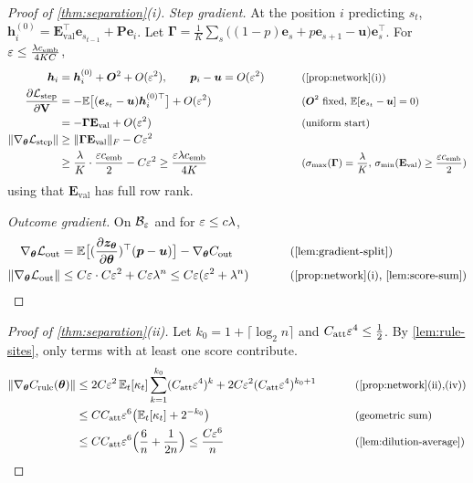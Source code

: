 \begin{proof}[Proof of \cref{thm:separation}(i)]
\emph{Step gradient.} At the position $i$ predicting $s_t$, $\bm h^{(0)}_i=\mathbf E_{\mathrm{val}}^\top\bm e_{s_{t-1}}+\mathbf P\bm e_i$. Let
$\bm\Gamma=\frac{1}{K}\sum_{s}\bigl((1-p)\bm e_s+p\bm e_{s+1}-\bm u\bigr)\bm e_s^\top$. For $\varepsilon\le\frac{\lambda c_{\mathrm{emb}}}{4KC}$,
\begin{alignat*}{2}
 \bm h_i&=\bm h^{(0)}_i+\bm O^2+O(\initscale^2),\qquad \bm p_i-\bm u=O(\initscale^2) &\qquad& \why{\cref{prop:network}(i)}\\
 \pd{\Lstep}{\mathbf V}&=-\E\bigl[(\bm e_{s_t}-\bm u)\bm h^{(0)\top}_i\bigr]+O(\initscale^2) && \why{$\bm O^2$ fixed, $\E[\bm e_{s_t}-\bm u]=0$}\\
 &=-\bm\Gamma\mathbf E_{\mathrm{val}}+O(\initscale^2) && \why{uniform start}\\
 \|\nabla_{\bm\theta}\Lstep\|&\ge\|\bm\Gamma\mathbf E_{\mathrm{val}}\|_F-C\initscale^2 && \\
 &\ge\frac{\mixrate}{K}\cdot\frac{\initscale\embconst}{2}-C\initscale^2\ge\frac{\initscale\mixrate\embconst}{4K} && \why{$\sigma_{\max}(\bm\Gamma)=\tfrac{\mixrate}{K}$, $\sigma_{\min}(\mathbf E_{\mathrm{val}})\ge\tfrac{\initscale\embconst}{2}$}
\end{alignat*}
using that $\mathbf E_{\mathrm{val}}$ has full row rank.

\emph{Outcome gradient.} On $\mathcal B_{\varepsilon}$ and for $\varepsilon\le c\lambda$,
\begin{alignat}{2}
 \nabla_{\bm\theta}\Lout&=\E\bigl[(\Jz)^\top(\bm p-\bm u)\bigr]-\nabla_{\bm\theta}\outcredit &\qquad& \why{\cref{lem:gradient-split}}\nonumber\\
 \|\nabla_{\bm\theta}\Lout\|&\le C\initscale\cdot C\initscale^2+C\initscale\mixrate^n\le C\initscale(\initscale^2+\mixrate^n) && \why{\cref{prop:network}(i), \cref{lem:score-sum}}\label{eq:outcome-grad}
\end{alignat}
\end{proof}

\begin{proof}[Proof of \cref{thm:separation}(ii)]
Let $k_0=1+\lceil\log_2n\rceil$ and $C_{\mathrm{att}}\varepsilon^4\le\frac{1}{2}$. By \cref{lem:rule-sites}, only terms with at least one score contribute.
\begin{alignat*}{2}
 \|\nabla_{\bm\theta}\rulecredit(\bm\theta)\|
 &\le2C\initscale^2\,\E_t[\kappa_t]\sum_{k=1}^{k_0}(\attconst\initscale^4)^k+2C\initscale^2(\attconst\initscale^4)^{k_0+1} &\qquad& \why{\cref{prop:network}(ii),(iv)}\\
 &\le C\attconst\initscale^6\bigl(\E_t[\kappa_t]+2^{-k_0}\bigr) && \why{geometric sum}\\
 &\le C\attconst\initscale^6\Bigl(\frac{6}{n}+\frac{1}{2n}\Bigr)\le\frac{C\initscale^6}{n} && \why{\cref{lem:dilution-average}}\qedhere
\end{alignat*}
\end{proof}

